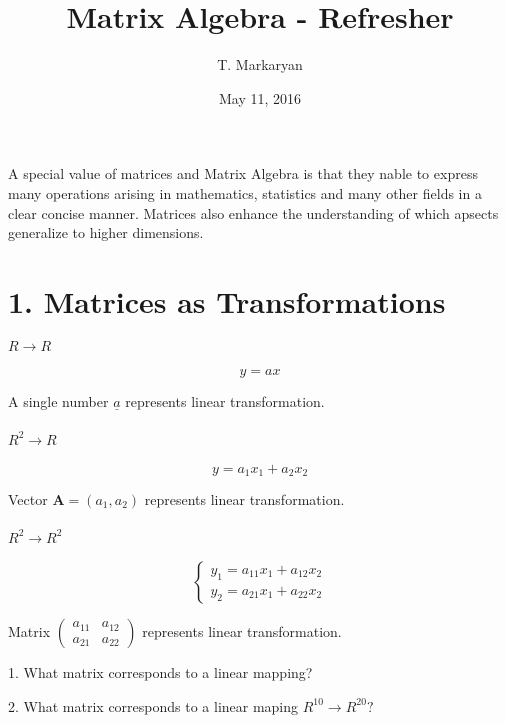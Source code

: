 \documentclass[]{article}
\title{Matrix Algebra - Refresher}
\author{T. Markaryan}
\date{May 11, 2016}
\let\oldparagraph\paragraph
\renewcommand{\paragraph}[1]{\oldparagraph{#1}\mbox{}}
\begin{document}
\maketitle

A special value of matrices and Matrix Algebra is that they nable to
express many operations arising in mathematics, statistics and many
other fields in a clear concise manner. Matrices also enhance the
understanding of which apsects generalize to higher dimensions.

\section{1. Matrices as
Transformations}\label{matrices-as-transformations}

\paragraph{\texorpdfstring{\(R \to R\)}{R \textbackslash{}to R}}\label{r-to-r}

\[y=ax\]

A single number \(\underline{a}\) represents linear transformation.

\paragraph{\texorpdfstring{\(R^2 \to R\)}{R\^{}2 \textbackslash{}to R}}\label{r2-to-r}

\[y=a_1x_1+a_2x_2\]

Vector \(\mathbf{A}=(a_1, a_2)\) represents linear transformation.

\paragraph{\texorpdfstring{\(R^2 \to R^2\)}{R\^{}2 \textbackslash{}to R\^{}2}}\label{r2-to-r2}

\[\begin{cases} y_1 = a_{11}x_1 + a_{12}x_2\\ y_2 = a_{21}x_1 + a_{22}x_2 \end{cases}\]

Matrix
\(\begin{pmatrix} a_{11} & a_{12} \\ a_{21} & a_{22} \end{pmatrix}\)
represents linear transformation.

\begin{tcolorbox}[colback=yellow!5,colframe=yellow!40!black,title=Questions]
1. What matrix corresponds to a linear mapping?

2. What matrix corresponds to a linear maping $R^{10} \to R^{20}?$
\end{tcolorbox}
\end{document}

